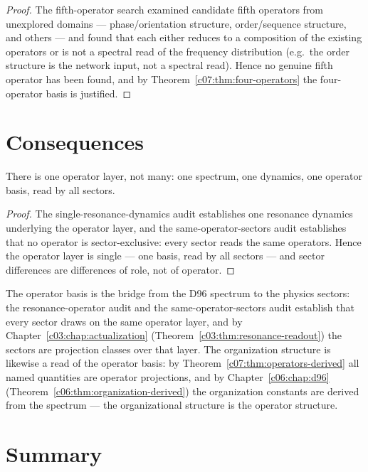 \begin{proof}
The fifth-operator search \cite{c07:QG307} examined candidate fifth operators from unexplored
domains --- phase/orientation structure, order/sequence structure, and others --- and found
that each either reduces to a composition of the existing operators or is not a spectral
read of the frequency distribution (e.g.\ the order structure is the network input, not a
spectral read). Hence no genuine fifth operator has been found, and by
Theorem~\ref{c07:thm:four-operators} the four-operator basis is justified.
\end{proof}

\section{Consequences}
\label{c07:sec:operator-consequences}

\begin{theorem}
\label{c07:thm:single-operator-layer}
There is one operator layer, not many: one spectrum, one dynamics, one operator basis, read
by all sectors.
\end{theorem}

\begin{proof}
The single-resonance-dynamics audit \cite{c07:QG263} establishes one resonance dynamics
underlying the operator layer, and the same-operator-sectors audit \cite{c07:QG262}
establishes that no operator is sector-exclusive: every sector reads the same operators.
Hence the operator layer is single --- one basis, read by all sectors --- and sector
differences are differences of role, not of operator.
\end{proof}

The operator basis is the bridge from the D96 spectrum to the physics sectors: the
resonance-operator audit \cite{c07:QG261} and the same-operator-sectors audit \cite{c07:QG262}
establish that every sector draws on the same operator layer, and by
Chapter~\ref{c03:chap:actualization} (Theorem~\ref{c03:thm:resonance-readout}) the sectors are
projection classes over that layer. The organization structure is likewise a read of the
operator basis: by Theorem~\ref{c07:thm:operators-derived} all named quantities are operator
projections, and by Chapter~\ref{c06:chap:d96} (Theorem~\ref{c06:thm:organization-derived}) the
organization constants are derived from the spectrum --- the organizational structure is the
operator structure.

\section{Summary}
\label{c07:sec:operators-summary}

